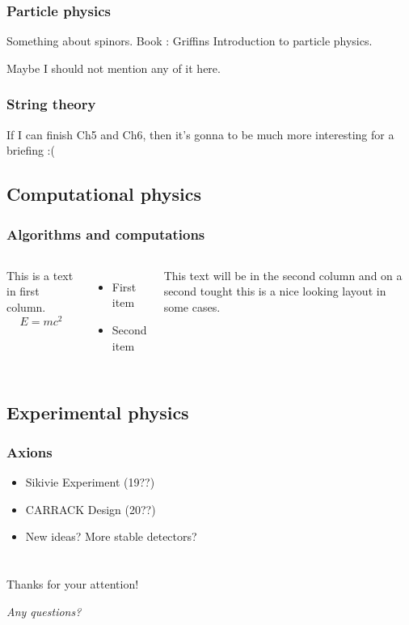 \documentclass{beamer}
\begin{document}
\begin{frame}
  \frametitle{Particle physics}
  Something about spinors.
  Book : Griffins Introduction to particle physics.\par  
  Maybe I should not mention any of it here.
  
\end{frame}

\begin{frame}
  \frametitle{String theory}
  If I can finish Ch5 and Ch6, then it's gonna to be much more
  interesting for a briefing :(
  
\end{frame}

\subsection{Computational physics}
\begin{frame}
  \frametitle{Algorithms and computations}
  \begin{columns}
    This is a text in first column.
    $$E=mc^2$$
    \begin{itemize}
    \item First item
    \item Second item
    \end{itemize}

    This text will be in the second column
    and on a second tought this is a nice looking
    layout in some cases.
  \end{columns}
  
\end{frame}

\subsection{Experimental physics}
\begin{frame}
  \frametitle{Axions}
  \begin{itemize}
  \item<1-> Sikivie Experiment (19??)
  \item<2-> CARRACK Design (20??)
  \item<3-> New ideas? More stable detectors?
  \end{itemize}
\end{frame}

\section{}
\begin{frame}
  \begin{center}
    \Huge{\alert{Thanks for your attention!}}\par
    \Huge{\textit{Any questions?}}
  \end{center}
  
\end{frame}
\end{document}
